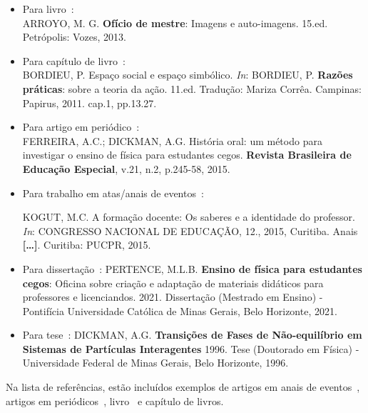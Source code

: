 \documentclass[a4paper,12pt]{article}
\begin{document}
	\begin{itemize}
		\item Para livro~\cite{arroyo}: \\
		
		\noindent ARROYO, M. G. {\bf Ofício de mestre}: Imagens e auto-imagens. 15.ed. Petrópolis: Vozes, 2013.
		
		\item Para capítulo de livro~\cite{bordieu}: \\
		
		\noindent BORDIEU, P. Espaço social e espaço simbólico. {\it In}: BORDIEU, P. {\bf Razões práticas}: sobre a teoria da ação. 11.ed. Tradução: Mariza Corrêa. Campinas: Papirus, 2011. cap.1, pp.13.27.
		
		\item Para artigo em periódico~\cite{ferreira}: \\
		
		\noindent FERREIRA, A.C.; DICKMAN, A.G. História oral: um método para investigar o ensino de física para estudantes cegos. {\bf Revista Brasileira de Educação Especial}, v.21, n.2, p.245-58, 2015.
		
		\item Para trabalho em atas/anais de eventos~\cite{kogut}:
		
		\noindent KOGUT, M.C. A formação docente: Os saberes e a identidade do professor. {\it In}: CONGRESSO NACIONAL DE EDUCAÇÃO, 12., 2015, Curitiba. Anais {\bf […]}. Curitiba: PUCPR, 2015.
		
		\item Para dissertação~\cite{exemplodiss}:
		\noindent PERTENCE, M.L.B. {\bf Ensino de física para estudantes cegos}: Oficina sobre criação e adaptação de materiais didáticos para professores e licenciandos. 2021. Dissertação (Mestrado em Ensino) - Pontifícia Universidade Católica de Minas Gerais, Belo Horizonte, 2021.
		
		\item Para tese~\cite{exemplotese}:
		\noindent DICKMAN, A.G. {\bf Transições de Fases de Não-equilíbrio em Sistemas de Partículas Interagentes} 1996. Tese (Doutorado em Física) - Universidade Federal de Minas Gerais, Belo Horizonte, 1996.
	\end{itemize}
	
	Na lista de referências, estão incluídos exemplos de artigos em anais de eventos~\cite{ponciano2017designing}, artigos em periódicos~\cite{ponciano2018agreement}, livro~\cite{swokowski1994} e capítulo de livros.
	
\end{document}
